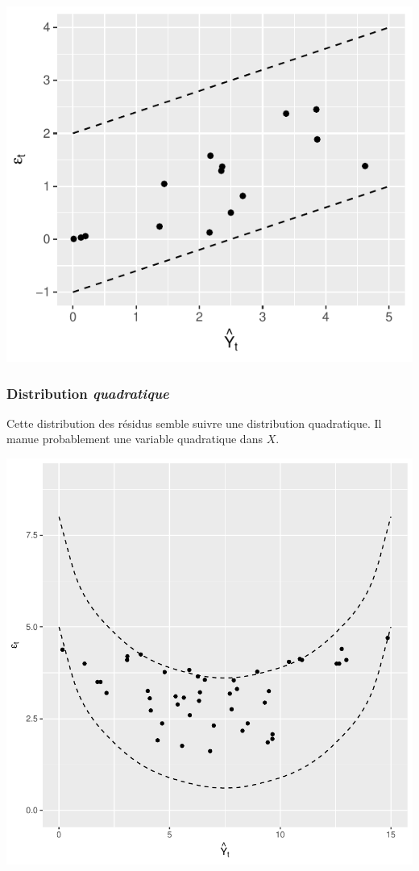 \documentclass[11pt,french]{report}
\begin{document}
\bigskip
\includegraphics{notes_de_cours-032}
\bigskip

\subsubsection{Distribution \emph{quadratique}}
Cette distribution des résidus semble suivre une distribution quadratique. Il manue probablement une variable quadratique dans $X$.

\bigskip
\includegraphics{notes_de_cours-033}
\end{document}
